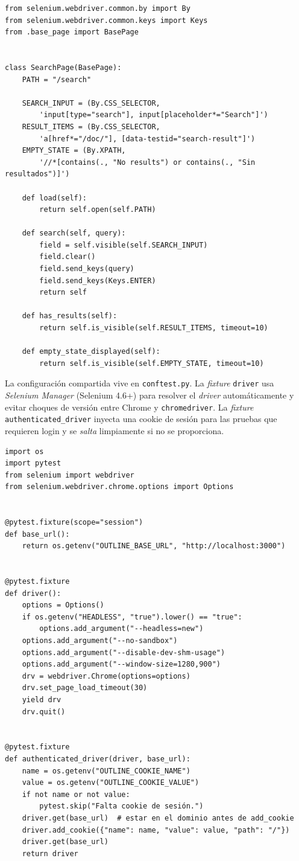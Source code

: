 \documentclass[12pt]{article}
\begin{document}
\begin{lstlisting}[style=py,caption={\texttt{pages/search\_page.py} --- Page Object de búsqueda.},captionpos=b]
from selenium.webdriver.common.by import By
from selenium.webdriver.common.keys import Keys
from .base_page import BasePage


class SearchPage(BasePage):
    PATH = "/search"

    SEARCH_INPUT = (By.CSS_SELECTOR,
        'input[type="search"], input[placeholder*="Search"]')
    RESULT_ITEMS = (By.CSS_SELECTOR,
        'a[href*="/doc/"], [data-testid="search-result"]')
    EMPTY_STATE = (By.XPATH,
        '//*[contains(., "No results") or contains(., "Sin resultados")]')

    def load(self):
        return self.open(self.PATH)

    def search(self, query):
        field = self.visible(self.SEARCH_INPUT)
        field.clear()
        field.send_keys(query)
        field.send_keys(Keys.ENTER)
        return self

    def has_results(self):
        return self.is_visible(self.RESULT_ITEMS, timeout=10)

    def empty_state_displayed(self):
        return self.is_visible(self.EMPTY_STATE, timeout=10)
\end{lstlisting}

La configuración compartida vive en \texttt{conftest.py}. La \textit{fixture}
\texttt{driver} usa \textit{Selenium Manager} (Selenium 4.6+) para resolver el
\textit{driver} automáticamente y evitar choques de versión entre Chrome y
\texttt{chromedriver}. La \textit{fixture} \texttt{authenticated\_driver} inyecta
una cookie de sesión para las pruebas que requieren login y se \textit{salta}
limpiamente si no se proporciona.

\begin{lstlisting}[style=py,caption={\texttt{conftest.py} --- fixtures de pytest.},captionpos=b]
import os
import pytest
from selenium import webdriver
from selenium.webdriver.chrome.options import Options


@pytest.fixture(scope="session")
def base_url():
    return os.getenv("OUTLINE_BASE_URL", "http://localhost:3000")


@pytest.fixture
def driver():
    options = Options()
    if os.getenv("HEADLESS", "true").lower() == "true":
        options.add_argument("--headless=new")
    options.add_argument("--no-sandbox")
    options.add_argument("--disable-dev-shm-usage")
    options.add_argument("--window-size=1280,900")
    drv = webdriver.Chrome(options=options)
    drv.set_page_load_timeout(30)
    yield drv
    drv.quit()


@pytest.fixture
def authenticated_driver(driver, base_url):
    name = os.getenv("OUTLINE_COOKIE_NAME")
    value = os.getenv("OUTLINE_COOKIE_VALUE")
    if not name or not value:
        pytest.skip("Falta cookie de sesión.")
    driver.get(base_url)  # estar en el dominio antes de add_cookie
    driver.add_cookie({"name": name, "value": value, "path": "/"})
    driver.get(base_url)
    return driver
\end{lstlisting}
\end{document}
